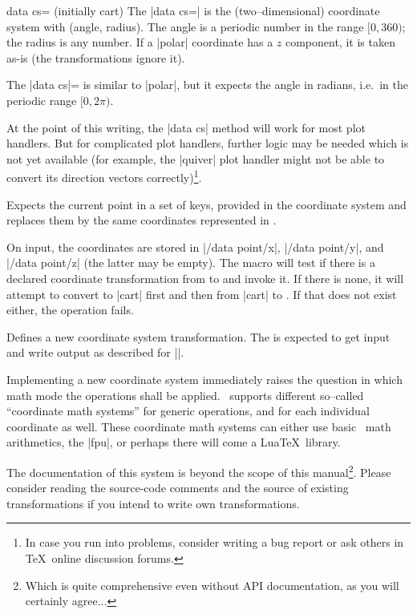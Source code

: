 \begin{pgfplotskey}{data cs= (initially cart)}
	The |data cs=| is the (two--dimensional) coordinate system with (angle, radius). The angle is a periodic number in the range $[0,360)$; the radius is any number. If a |polar| coordinate has a $z$ component, it is taken as-is (the transformations ignore it).

	The |data cs|= is similar to |polar|, but it expects the angle in radians, i.e.\ in the periodic range $[0,2\pi)$.

	At the point of this writing, the |data cs| method will work for most plot handlers. But for complicated plot handlers, further logic may be needed which is not yet available (for example, the |quiver| plot handler might not be able to convert its direction vectors correctly)\footnote{In case you run into problems, consider writing a bug report or ask others in \TeX\ online discussion forums.}.
\end{pgfplotskey}

\begin{command}{\pgfplotsaxistransformcs{}}
	Expects the current point in a set of keys, provided in the coordinate system  and replaces them by the same coordinates represented in .

	On input, the coordinates are stored in |/data point/x|, |/data point/y|, and |/data point/z| (the latter may be empty). The macro will test if there is a declared coordinate transformation from  to  and invoke it. If there is none, it will attempt to convert to |cart| first and then from |cart| to . If that does not exist either, the operation fails.
\end{command}

\begin{command}{\pgfplotsdefinecstransform{}}
	Defines a new coordinate system transformation. The  is expected to get input and write output as described for |\pgfplotsaxistransformcs|.

	Implementing a new coordinate system immediately raises the question in which math mode the operations shall be applied. \PGFPlots\ supports different so--called ``coordinate math systems'' for generic operations, and for each individual coordinate as well. These coordinate math systems can either use basic \PGF\ math arithmetics, the |fpu|, or perhaps there will come a Lua\TeX\ library.

	The documentation of this system is beyond the scope of this manual\footnote{Which is quite comprehensive even without API documentation, as you will certainly agree...}. Please consider reading the source-code comments and the source of existing transformations if you intend to write own transformations.
\end{command}
